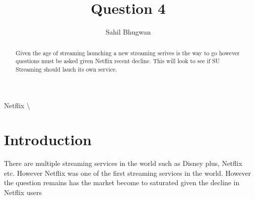 \documentclass[12pt,preprint, authoryear]{elsarticle}
\numberwithin{equation}{section}
\numberwithin{figure}{section}
\numberwithin{table}{section}
\begin{document}
\begin{frontmatter}  %

\title{Question 4}





\author[Add1]{Sahil Bhugwan}





\address[Add1]{Github- \url{https://github.com/SBhugwan}}


\begin{abstract}
\small{
Given the age of streaming launching a new streaming serives is the way
to go however questions must be asked given Netflix recent decline. This
will look to see if SU Streaming should lauch its own service.
}
\end{abstract}

\vspace{1cm}


\begin{keyword}
\footnotesize{
Netflix \textbackslash{} \\
\vspace{0.3cm}
}
\end{keyword}



\vspace{0.5cm}

\end{frontmatter}



\pagestyle{fancy}
\chead{}
\rhead{}
\lfoot{}
\lhead{}
\cfoot{}


\headsep 35pt %




\hypertarget{introduction}{%
\section{\texorpdfstring{Introduction
\label{Introduction}}{Introduction }}\label{introduction}}

There are multiple streaming services in the world such as Disney plus,
Netflix etc. However Netflix was one of the first streaming services in
the world. However the question remains has the market become to
saturated given the decline in Netflix users
\end{document}
